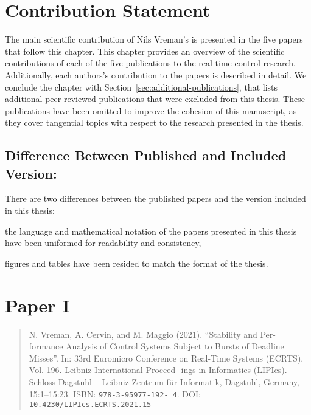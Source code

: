 \documentclass{article}
\begin{document}
\section*{Contribution Statement}

The main scientific contribution of Nils Vreman's is presented in the five papers that follow this chapter.
This chapter provides an overview of the scientific contributions of each of the five publications to the real-time control research.
Additionally, each authors's contribution to the papers is described in detail.
We conclude the chapter with Section~\ref{sec:additional-publications}, that lists additional peer-reviewed publications that were excluded from this thesis.
These publications have been omitted to improve the cohesion of this manuscript, as they cover tangential topics with respect to the research presented in the thesis.

\subsection*{Difference Between Published and Included Version:}%
There are two differences between the published papers and the version included in this thesis:
\begin{enumerate*}[label=(\roman*)]
\item the language and mathematical notation of the papers presented in this thesis have been uniformed for readability and consistency,
\item figures and tables have been resided to match the format of the thesis.
\end{enumerate*}


%
\section*{Paper I}%
%
\begin{quote}

N. Vreman, A. Cervin, and M. Maggio (2021). ``Stability and Per- formance Analysis of Control Systems Subject to Bursts of Deadline Misses''. In: 33rd Euromicro Conference on Real-Time Systems (ECRTS). Vol. 196. Leibniz International Proceed- ings in Informatics (LIPIcs). Schloss Dagstuhl – Leibniz-Zentrum für Informatik, Dagstuhl, Germany, 15:1–15:23. ISBN: \texttt{978-3-95977-192- 4}. DOI: \texttt{10.4230/LIPIcs.ECRTS.2021.15}

\end{quote}
\end{document}
